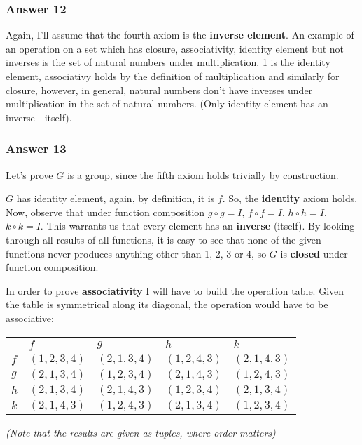\documentclass[11pt]{article}
\begin{document}
\subsubsection{Answer 12}
\label{sec-1-3-3}
Again, I'll assume that the fourth axiom is the \textbf{inverse element}.
An example of an operation on a set which has closure, associativity,
identity element but not inverses is the set of natural numbers under
multiplication.  1 is the identity element, associativy holds by the
definition of multiplication and similarly for closure, however, in
general, natural numbers don't have inverses under multiplication in
the set of natural numbers.  (Only identity element has an inverse---itself).
\subsubsection{Answer 13}
\label{sec-1-3-4}
Let's prove $G$ is a group, since the fifth axiom holds trivially by
construction.

$G$ has identity element, again, by definition, it is $f$.  So,
the \textbf{identity} axiom holds. Now, observe that under function composition
$g \circ g = I$, $f \circ f = I$, $h \circ h = I$, $k \circ k = I$.
This warrants us that every element has an \textbf{inverse} (itself).  By looking
through all results of all functions, it is easy to see that none of the
given functions never produces anything other than 1, 2, 3 or 4, so $G$
is \textbf{closed} under function composition.

In order to prove \textbf{associativity} I will have to build the operation
table.  Given the table is symmetrical along its diagonal, the operation
would have to be associative:

\begin{center}
\begin{tabular}{l|llll}
 & $f$ & $g$ & $h$ & $k$\\
\hline
$f$ & $(1,2,3,4)$ & $(2,1,3,4)$ & $(1,2,4,3)$ & $(2,1,4,3)$\\
$g$ & $(2,1,3,4)$ & $(1,2,3,4)$ & $(2,1,4,3)$ & $(1,2,4,3)$\\
$h$ & $(2,1,3,4)$ & $(2,1,4,3)$ & $(1,2,3,4)$ & $(2,1,3,4)$\\
$k$ & $(2,1,4,3)$ & $(1,2,4,3)$ & $(2,1,3,4)$ & $(1,2,3,4)$\\
\end{tabular}
\end{center}

\emph{(Note that the results are given as tuples, where order matters)}
\end{document}

